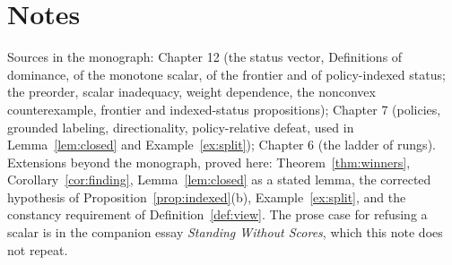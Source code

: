\documentclass[11pt]{article}
\theoremstyle{plain}
\theoremstyle{definition}
\theoremstyle{remark}
\begin{document}
\section*{Notes}

Sources in the monograph: Chapter 12 (the status vector, Definitions of dominance, of the monotone scalar, of the frontier and of policy-indexed status; the preorder, scalar inadequacy, weight dependence, the nonconvex counterexample, frontier and indexed-status propositions); Chapter 7 (policies, grounded labeling, directionality, policy-relative defeat, used in Lemma~\ref{lem:closed} and Example~\ref{ex:split}); Chapter 6 (the ladder of rungs). Extensions beyond the monograph, proved here: Theorem~\ref{thm:winners}, Corollary~\ref{cor:finding}, Lemma~\ref{lem:closed} as a stated lemma, the corrected hypothesis of Proposition~\ref{prop:indexed}(b), Example~\ref{ex:split}, and the constancy requirement of Definition~\ref{def:view}. The prose case for refusing a scalar is in the companion essay \emph{Standing Without Scores}, which this note does not repeat.
\end{document}
